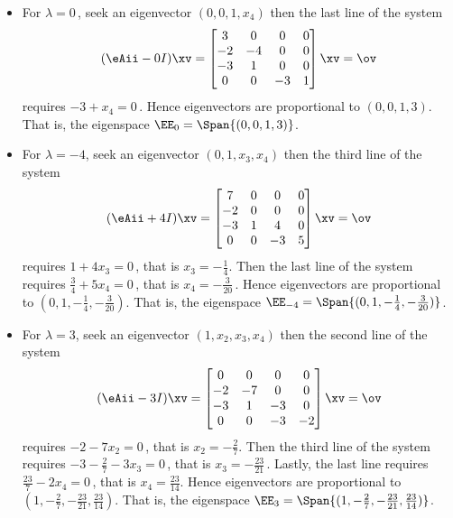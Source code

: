 \begin{example}
\begin{enumerate}
\begin{solution}
\begin{itemize}
\item For \(\lambda=0\)\,, seek an eigenvector \((0,0,1,x_4)\) then the last line of the system
\begin{equation*}
(\eAii-0I)\xv=
\begin{bmatrix}3&0&0&0
\\-2&-4&0&0
\\-3&1&0&0
\\0&0&-3&1 \end{bmatrix}\xv=\ov
\end{equation*}
requires \(-3+x_4=0\)\,.  
Hence eigenvectors are proportional to \((0,0,1,3)\).
That is, the eigenspace \(\EE_{0}=\Span\{(0,0,1,3)\}\).

\item For \(\lambda=-4\), seek an eigenvector \((0,1,x_3,x_4)\) then the third line of the system
\begin{equation*}
(\eAii+4I)\xv=
\begin{bmatrix}7&0&0&0
\\-2&0&0&0
\\-3&1&4&0
\\0&0&-3&5 \end{bmatrix}\xv=\ov
\end{equation*}
requires \(1+4x_3=0\)\,, that is \(x_3=-\frac14\).
Then the last line of the system requires \(\frac34+5x_4=0\)\,, that is \(x_4=-\frac3{20}\)\,. 
Hence eigenvectors are proportional to \((0,1,-\frac14,-\frac3{20})\).
That is, the eigenspace \(\EE_{-4}=\Span\{(0,1,-\frac14,-\frac3{20})\}\).

\item For \(\lambda=3\), seek an eigenvector \((1,x_2,x_3,x_4)\) then the second line of the system
\begin{equation*}
(\eAii-3I)\xv=
\begin{bmatrix}0&0&0&0
\\-2&-7&0&0
\\-3&1&-3&0
\\0&0&-3&-2 \end{bmatrix}\xv=\ov
\end{equation*}
requires \(-2-7x_2=0\)\,, that is \(x_2=-\frac27\).
Then the third line of the system requires \(-3-\frac27-3x_3=0\)\,, that is \(x_3=-\frac{23}{21}\)\,. 
Lastly, the last line requires \(\frac{23}7-2x_4=0\)\,, that is \(x_4=\frac{23}{14}\).
Hence eigenvectors are proportional to \((1,-\frac27,-\frac{23}{21},\frac{23}{14})\).
That is, the eigenspace \(\EE_{3}=\Span\{(1,-\frac27,-\frac{23}{21},\frac{23}{14})\}\).


\end{itemize}
\end{solution}
\end{enumerate}
\end{example}

